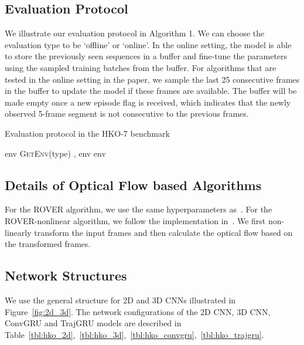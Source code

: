 \documentclass{article}
\begin{document}
\subsection{Evaluation Protocol}
We illustrate our evaluation protocol in Algorithm 1. We can choose the evaluation type to be `offline' or `online'. In the online setting, the model is able to store the previously seen sequences in a buffer and fine-tune the parameters using the sampled training batches from the buffer. For algorithms that are tested in the online setting in the paper, we sample the last 25 consecutive frames in the buffer to update the model if these frames are available. The buffer will be made empty once a new episode flag is received, which indicates that the newly observed 5-frame segment is not consecutive to the previous frames.
\begin{algorithm}[h!]
  \caption{Evaluation protocol in the HKO-7 benchmark}
  \begin{algorithmic}[1]
    \State env  \textsc{GetEnv}(type)
    \State ,  
    \State 
    \State 
    \EndIf
    \State 
    \State env
    \EndWhile
    \State env
    \EndProcedure
    \label{alg:hko7}
  \end{algorithmic}
\end{algorithm}

\subsection{Details of Optical Flow based Algorithms}
For the ROVER algorithm, we use the same hyperparameters as~\cite{xingjian2015convolutional}. For the ROVER-nonlinear algorithm, we follow the implementation in~\cite{woo2017operational}. We first non-linearly transform the input frames and then calculate the optical flow based on the transformed frames.

\subsection{Network Structures}
We use the general structure for 2D and 3D CNNs illustrated in Figure~\ref{fig:2d_3d}. The network configurations of the 2D CNN, 3D CNN, ConvGRU and TrajGRU models are described in Table~\ref{tbl:hko_2d},~\ref{tbl:hko_3d},~\ref{tbl:hko_convgru},~\ref{tbl:hko_trajgru}.
\end{document}
